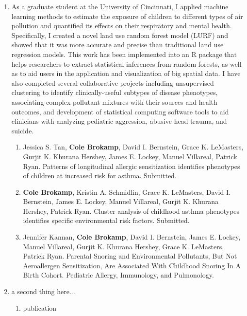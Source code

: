 \documentclass{nihbiosketch}
\begin{document}
\begin{enumerate}

\item As a graduate student at the University of Cincinnati, I applied machine learning methods to estimate the exposure of children to different types of air pollution and quantified its effects on their respiratory and mental health. Specifically, I created a novel land use random forest model (LURF) and showed that it was more accurate and precise than traditional land use regression models. This work has been implemented into an R package that helps researchers to extract statistical inferences from random forests, as well as to aid users in the application and visualization of big spatial data. I have also completed several collaborative projects including unsupervised clustering to identify clinically-useful subtypes of disease phenotypes, associating complex pollutant mixtures with their sources and health outcomes, and development of statistical computing software tools to aid clinicians with analyzing pediatric aggression, abusive head trauma, and suicide.

\begin{enumerate}

\item Jessica S. Tan, \textbf{Cole Brokamp}, David I. Bernstein, Grace K. LeMasters, Gurjit K. Khurana Hershey, James E. Lockey, Manuel Villareal, Patrick Ryan. Patterns of longitudinal allergic sensitization identifies phenotypes of children at increased risk for asthma. Submitted.

\item \textbf{Cole Brokamp}, Kristin A. Schmidlin, Grace K. LeMasters, David I. Bernstein, James E. Lockey, Manuel Villareal, Gurjit K. Khurana Hershey, Patrick Ryan. Cluster analysis of childhood asthma phenotypes identifies specific environmental risk factors. Submitted.

\item Jennifer Kannan, \textbf{Cole Brokamp}, David I. Bernstein, James E. Lockey, Manuel Villareal, Gurjit K. Khurana Hershey, Grace K. LeMasters, Patrick Ryan. Parental Snoring and Environmental Pollutants, But Not Aeroallergen Sensitization, Are Associated With Childhood Snoring In A Birth Cohort. Pediatric Allergy, Immunology, and Pulmonology.

\end{enumerate}


\item a second thing here...

\begin{enumerate}

\item publication
        
\end{enumerate}

\end{enumerate}
\end{document}
